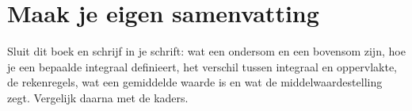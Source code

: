 
\ifzelfstudie
\section*{Maak je eigen samenvatting}
Sluit dit boek en schrijf in je schrift: wat een ondersom en een bovensom zijn, hoe je een bepaalde integraal definieert, het verschil tussen integraal en oppervlakte, de rekenregels, wat een gemiddelde waarde is en wat de middelwaardestelling zegt. Vergelijk daarna met de kaders.
\fi
